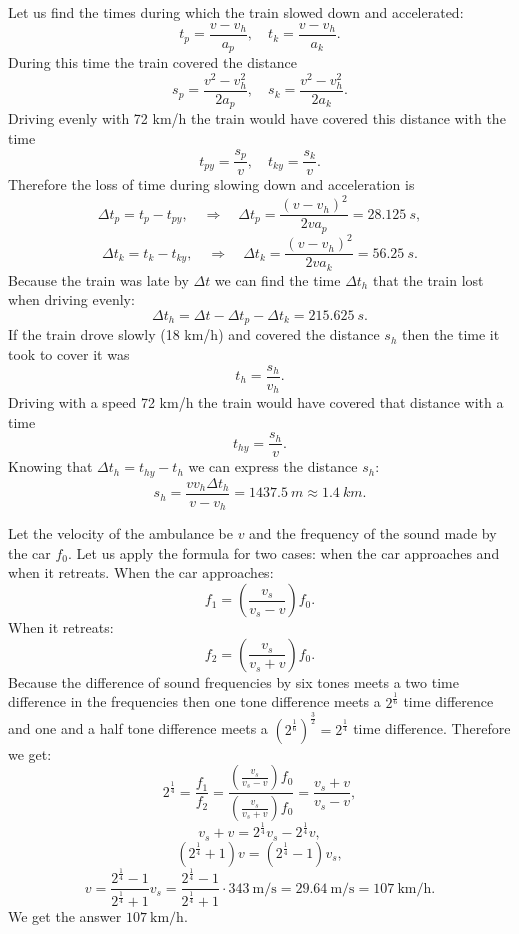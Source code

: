 \documentclass[11pt]{article}
\begin{document}
\solueng
Let us find the times during which the train slowed down and accelerated:
\[ t_p = \frac{v - v_h}{a_p},\quad t_k = \frac{v-v_h}{a_k}. \]
During this time the train covered the distance
\[ s_p = \frac{v^2-v_h^2}{2a_p}, \quad s_k = \frac{v^2-v_h^2}{2a_k}. \]
Driving evenly with 72 km/h the train would have covered this distance with the time
\[ t_{py} = \frac{s_p}{v},\quad t_{ky} =\frac{s_k}{v}. \]
Therefore the loss of time during slowing down and acceleration is
\[ \Delta t_p =  t_{p} - t_{py}, \quad\Rightarrow\quad \Delta t_p = \frac{(v-v_h)^2}{2va_p}=\SI{28,125}{s},\]
\[ \Delta t_k =  t_{k} - t_{ky}, \quad\Rightarrow\quad \Delta t_k = \frac{(v-v_h)^2}{2va_k}=\SI{56,25}{s}.\]
Because the train was late by $\Delta t$ we can find the time $\Delta t_h$ that the train lost when driving evenly:
\[ \Delta t_h = \Delta t - \Delta t_p - \Delta t_k = \SI{215,625}{s}. \]
If the train drove slowly (18 km/h) and covered the distance $s_h$ then the time it took to cover it was
\[ t_h = \frac{s_h}{v_h}. \] 
Driving with a speed 72 km/h the train would have covered that distance with a time
\[ t_{hy} = \frac{s_h}{v}. \]
Knowing that $\Delta t_h = t_{hy} - t_h$ we can express the distance $s_h$:
\[ s_h = \frac{vv_h\Delta t_h}{v-v_h} = \SI{1437,5}{m} \approx \SI{1,4}{km}.\]
\probend
\bigskip


\solueng
Let the velocity of the ambulance be $v$ and the frequency of the sound made by the car $f_0$. Let us apply the formula for two cases: when the car approaches and when it retreats. 
When the car approaches:
\[f_1 = \left(\frac{v_s}{v_s - v}\right)f_0.\]
When it retreats:
\[f_2 = \left(\frac{v_s}{v_s + v}\right)f_0.\]
Because the difference of sound frequencies by six tones meets a two time difference in the frequencies then one tone difference meets a $2^{\frac 1 6}$ time difference and one and a half tone difference meets a $\left(2^{\frac 1 6}\right)^{\frac 3 2} = 2^{\frac 1 4}$ time difference. Therefore we get:
\[2^{\frac 1 4} = \frac{f_1}{f_2} = \frac{(\frac{v_s}{v_s - v})f_0}{(\frac{v_s}{v_s + v})f_0} = \frac{v_s + v}{v_s - v},\]
\[v_s + v = 2^{\frac 1 4}v_s - 2^{\frac 1 4}v,\]
\[(2^{\frac 1 4} + 1)v = (2^{\frac 1 4} - 1)v_s,\]
\[v = \frac{2^{\frac 1 4} - 1}{2^{\frac 1 4} + 1}v_s = \frac{2^{\frac 1 4} - 1}{2^{\frac 1 4} + 1} \cdot \SI{343}{\meter\per\second} = \SI{29.64}{\meter\per\second} = \SI{107}{\kilo\meter\per\hour}. \]
We get the answer $\SI{107}{\kilo\meter\per\hour}$.
\probend
\bigskip
\end{document}
